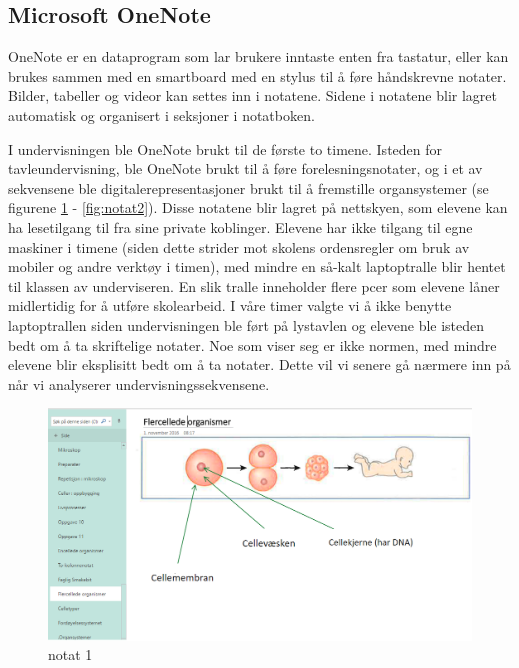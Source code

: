 \documentclass[main.tex]{subfiles}
\begin{document}
\subsection*{Microsoft OneNote}

OneNote er en dataprogram som lar brukere inntaste enten fra tastatur, eller kan brukes sammen med en smartboard
med en stylus til å føre håndskrevne notater. Bilder, tabeller og videor kan settes inn i notatene. Sidene i notatene blir
lagret automatisk og organisert i seksjoner i notatboken.

I undervisningen ble OneNote brukt til de første to timene. Isteden for tavleundervisning, ble OneNote brukt til å føre 
forelesningsnotater, og i et av sekvensene ble digitalerepresentasjoner brukt til å fremstille organsystemer 
(se figurene \ref{fig:notat1} - \ref{fig:notat2}). Disse notatene blir lagret på nettskyen, som elevene kan ha 
lesetilgang til fra sine private koblinger. Elevene har ikke tilgang til egne maskiner i timene (siden dette strider
mot skolens ordensregler om bruk av mobiler og andre verktøy i timen), med mindre en så-kalt laptoptralle blir hentet 
til klassen av underviseren. En slik tralle inneholder flere pcer som elevene låner midlertidig for å utføre skolearbeid. 
I våre timer valgte vi å ikke benytte laptoptrallen siden undervisningen ble ført på lystavlen og elevene ble isteden bedt 
om å ta skriftelige notater. Noe som viser seg er ikke normen, med mindre elevene blir eksplisitt bedt om å ta notater. 
Dette vil vi senere gå nærmere inn på når vi analyserer undervisningssekvensene.

\begin{figure}[h!]
\includegraphics[scale = 0.6]{../figures/onenote_flercellet.png}
\caption{notat 1}
\label{fig:notat1}
\end{figure}
\end{document}
